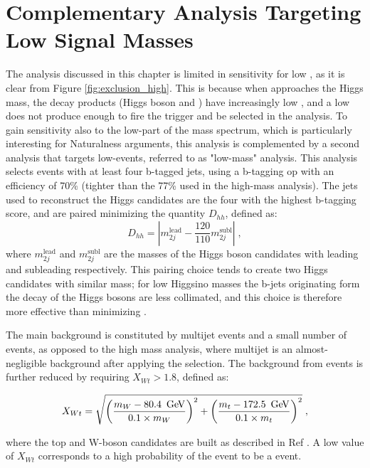 \section{Complementary Analysis Targeting Low Signal Masses}
\label{sec:ewk:LM}

The analysis discussed in this chapter is limited in sensitivity for low \mhino, as it is clear from Figure \ref{fig:exclusion_high}. 
This is because when \mhino approaches the Higgs mass, the decay products (Higgs boson and \gravino)
have increasingly low \pt, and a low \pt \gravino does not produce enough \met to fire the \met trigger and be selected 
in the analysis. 
To gain sensitivity also to the low-\mhino part of the mass spectrum, which is particularly interesting for Naturalness arguments, 
this analysis is complemented by a second analysis that targets low-\met events, referred to as "low-mass" analysis. 
This analysis selects events with at least four b-tagged jets, using a b-tagging \gls{op} with an efficiency of 70\%
(tighter than the 77\% used in the high-mass analysis).
The jets used to reconstruct the Higgs candidates are the four with the highest b-tagging score, and are paired minimizing the quantity 
$D_{hh}$, defined as:
\begin{equation}
  D_{hh} = \left|m_{2j}^\textrm{lead} - \frac{120}{110}m_{2j}^\textrm{subl}\right| \; ,
\end{equation}
where $m_{2j}^\textrm{lead}$ and $m_{2j}^\textrm{subl}$ are the masses of the Higgs boson candidates with leading and subleading \pt respectively.
This pairing choice tends to create two Higgs candidates with similar mass; 
for low Higgsino masses the b-jets originating form the decay of the Higgs bosons are less collimated, 
and this choice is therefore more effective than minimizing \dRmax. 

The main background is constituted by multijet events and a small number of \ttbar events, as opposed to the
high mass analysis, where multijet is an almost-negligible background after applying the \dphimin selection. 
The background from \ttbar events is further reduced by requiring $X_{Wt}>1.8$, defined as:

\begin{equation}
 X_{Wt} = \sqrt{\left( \frac{m_W - 80.4\,\ \gev}{0.1 \times m_W} \right)^2 + \left( \frac{m_t - 172.5\,\ \gev}{0.1 \times m_t} \right)^2 } \;,
\label{eqn:xwt}
\end{equation}

\noindent where the top and W-boson candidates are built as described in Ref \cite{Aaboud:2018htj}. 
A low value of $X_{Wt}$ corresponds to a high probability of the event to be a \ttbar event. 

